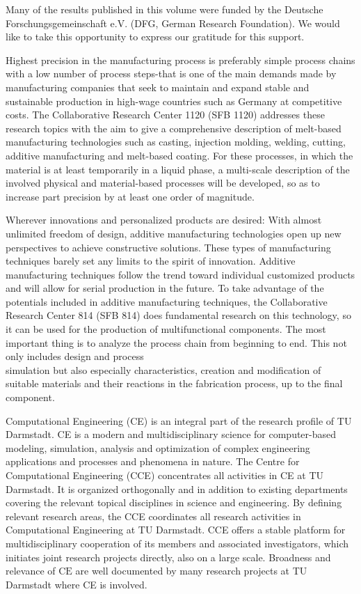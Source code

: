 \documentclass[10pt]{article}
\begin{document}
Many of the results published in this volume were funded by the Deutsche Forschungsgemeinschaft e.V. (DFG, German Research Foundation). We would like to take this opportunity to express our gratitude for this support.

Highest precision in the manufacturing process is preferably simple process chains with a low number of process steps-that is one of the main demands made by manufacturing companies that seek to maintain and expand stable and sustainable production in high-wage countries such as Germany at competitive costs. The Collaborative Research Center 1120 (SFB 1120) addresses these research topics with the aim to give a comprehensive description of melt-based manufacturing technologies such as casting, injection molding, welding, cutting, additive manufacturing and melt-based coating. For these processes, in which the material is at least temporarily in a liquid phase, a multi-scale description of the involved physical and material-based processes will be developed, so as to increase part precision by at least one order of magnitude.

Wherever innovations and personalized products are desired: With almost unlimited freedom of design, additive manufacturing technologies open up new perspectives to achieve constructive solutions. These types of manufacturing techniques barely set any limits to the spirit of innovation. Additive manufacturing techniques follow the trend toward individual customized products and will allow for serial production in the future. To take advantage of the potentials included in additive manufacturing techniques, the Collaborative Research Center 814 (SFB 814) does fundamental research on this technology, so it can be used for the production of multifunctional components. The most important thing is to analyze the process chain from beginning to end. This not only includes design and process\\
simulation but also especially characteristics, creation and modification of suitable materials and their reactions in the fabrication process, up to the final component.

Computational Engineering (CE) is an integral part of the research profile of TU Darmstadt. CE is a modern and multidisciplinary science for computer-based modeling, simulation, analysis and optimization of complex engineering applications and processes and phenomena in nature. The Centre for Computational Engineering (CCE) concentrates all activities in CE at TU Darmstadt. It is organized orthogonally and in addition to existing departments covering the relevant topical disciplines in science and engineering. By defining relevant research areas, the CCE coordinates all research activities in Computational Engineering at TU Darmstadt. CCE offers a stable platform for multidisciplinary cooperation of its members and associated investigators, which initiates joint research projects directly, also on a large scale. Broadness and relevance of $\mathrm{CE}$ are well documented by many research projects at TU Darmstadt where CE is involved.
\end{document}
